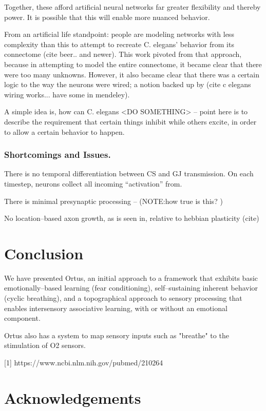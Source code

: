 \documentclass[letterpaper]{article}
\begin{document}
Together, these afford artificial neural networks far greater flexibility and thereby power. It is possible that this will enable more nuanced behavior.

From an artificial life standpoint: people are modeling networks with less complexity than this to attempt to recreate C. elegans' behavior from its connectome (cite beer.. and newer). This work pivoted from that approach, because in attempting to model the entire connectome, it became clear that there were too many unknowns. However, it also became clear that there was a certain logic to the way the neurons were wired; a notion backed up by (cite c elegans wiring works... have some in mendeley).

A simple idea is, how can C. elegans <DO SOMETHING> -- point here is to describe the requirement that certain things inhibit while others excite, in order to allow a certain behavior to happen.

\subsubsection{Shortcomings and Issues.}
There is no temporal differentiation between CS and GJ transmission. On each timestep, neurons collect all incoming ``activation'' from.

There is minimal presynaptic processing -- (NOTE:how true is this? )

No location--based axon growth, as is seen in, relative to hebbian plasticity (cite)





\section{Conclusion}
We have presented Ortus, an initial approach to a framework that exhibits basic emotionally--based learning (fear conditioning), self--sustaining inherent behavior (cyclic breathing), and a topographical approach to sensory processing that enables intersensory associative learning, with or without an emotional component.

Ortus also has a system to map sensory inputs such as "breathe" to the stimulation of O2 sensors.



[1] https://www.ncbi.nlm.nih.gov/pubmed/210264



\section{Acknowledgements}
\end{document}
